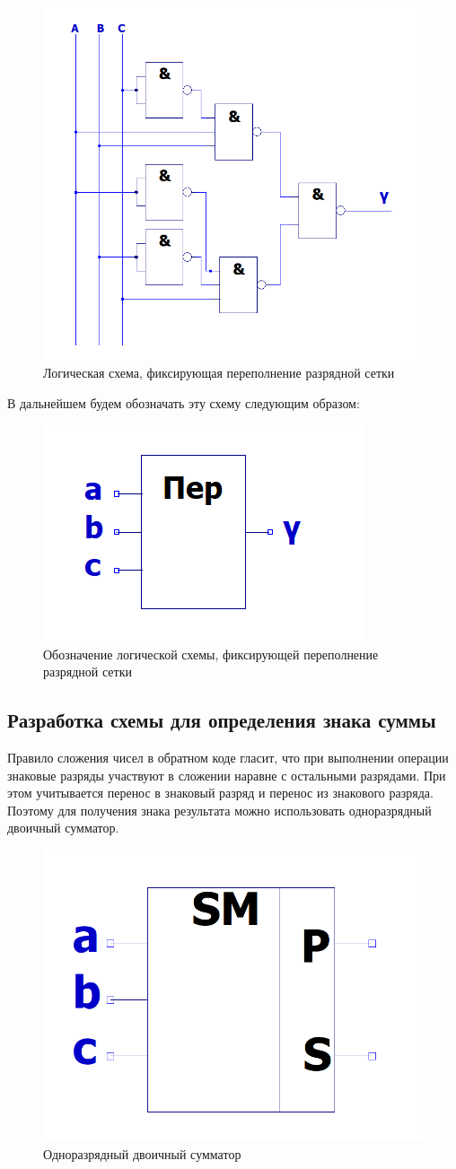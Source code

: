 \documentclass[a4paper,14pt]{article}
\begin{document}
\begin{figure}[H]
	\centering
	\includegraphics[width=0.5\linewidth]{schemas/per}
	\caption{Логическая схема, фиксирующая переполнение разрядной сетки}
	\label{fig:per}
\end{figure}

В дальнейшем будем обозначать эту схему следующим образом:

\begin{figure}[H]
	\centering
	\includegraphics[width=0.2\linewidth]{schemas/per_el}
	\caption{Обозначение логической схемы, фиксирующей переполнение разрядной сетки}
	\label{fig:per_el}
\end{figure}

\subsection{Разработка схемы для определения знака суммы}

Правило сложения чисел в обратном коде гласит, что при выполнении операции знаковые разряды участвуют в сложении наравне с остальными разрядами. При этом учитывается  перенос в знаковый разряд и перенос из знакового разряда. Поэтому для получения знака результата можно использовать  одноразрядный двоичный сумматор.

\begin{figure}[H]
	\centering
	\includegraphics[width=0.3\linewidth]{schemas/sm_el}
	\caption{Одноразрядный двоичный сумматор}
	\label{fig:sm_el_2}
\end{figure}
\end{document}
